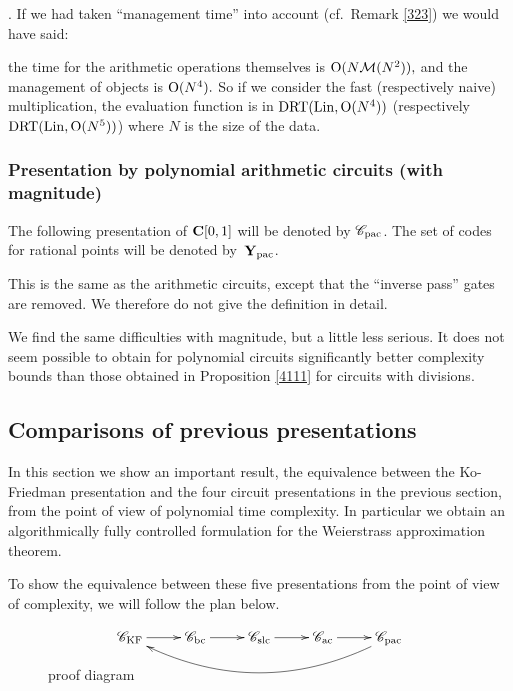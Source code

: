 . If we had taken ``management time'' into account (cf.\ Remark \ref{323}) we would have said: 

\noindent 	
the time for the arithmetic operations themselves is ${\rm O}(N {{\cal M}}(N^2)),$ 
and the management of objects is ${\rm O}(N^4).$ So if we consider the 
fast (respectively naive) multiplication, the evaluation function 
is in $ {\rm DRT}({\rm Lin},{\rm O}(N^4))$ (respectively ${\rm DRT}({\rm Lin},{\rm O}(N^5))$) where $N$ is the size of the data.

\subsubsection{Presentation by polynomial arithmetic circuits (with 
magnitude)}\label{subsubsec414}

The following presentation of ${{\bf C}[0,1]}$ will be denoted by ${{{\mathscr C}}_{\rm pac}}$. The set of codes for rational points will be denoted by~${{\bf Y}_{\rm pac}}$. 

\noindent 
This is the same as the arithmetic circuits, except that 
the ``inverse pass'' gates are removed. We therefore do not give 
the definition in detail.

\noindent 
We find the same difficulties with magnitude, but a little less serious. 
 It does not seem possible to obtain for polynomial circuits significantly better complexity bounds than those obtained in Proposition 
\ref{4111} for circuits with divisions.


\subsection{Comparisons of previous presentations}\label{subsec42}

In this section we show an important result, the equivalence between 
the Ko-Friedman presentation and the four circuit presentations in the previous section, from the point of view of polynomial time complexity. 
 In particular we obtain an  algorithmically fully controlled formulation 
for the Weierstrass approximation theorem. 

\noindent 
To show the equivalence between these five presentations from the point of view of complexity, we will follow the plan below.

\begin{figure}[htbp]
\begin{center}
$$
\xymatrix @R=15pt{
  \ckf\ar[r] &  \cbo\ar[r] &  \csl\ar[r] &  \caf\ar[r] & \capo\ar@/^25pt/[llll] 
}
$$ 
\end{center}
\medskip\caption[Proof diagram]{\label{fi421}proof diagram  
}  
\end{figure}  


